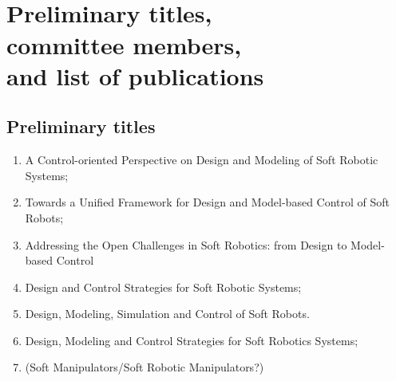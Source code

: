 \chapter*{\vspace{-45mm}\\ Preliminary titles,\\ committee members, \\and list of publications}
\newcommand{\ipj}{(\textit{in preparation for journal submission})}
\newcommand{\cur}{(\textit{under review})}
\section*{Preliminary titles}
\begin{enumerate}[leftmargin=2.5mm]
\item A Control-oriented Perspective on Design and Modeling of Soft Robotic Systems;
\item Towards a Unified Framework for Design and Model-based Control of Soft Robots;
\item Addressing the Open Challenges in Soft Robotics: from Design to Model-based Control
\item Design and Control Strategies for Soft Robotic Systems;
\item Design, Modeling, Simulation and Control of Soft Robots.
\item Design, Modeling and Control Strategies for Soft Robotics Systems;
\item (Soft Manipulators/Soft Robotic Manipulators?)
\end{enumerate}

